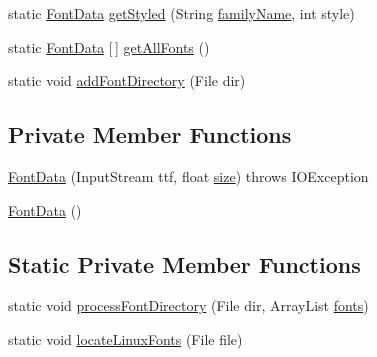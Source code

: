 \begin{DoxyCompactItemize}
\item 
static \mbox{\hyperlink{classorg_1_1newdawn_1_1slick_1_1tools_1_1hiero_1_1truetype_1_1_font_data}{Font\+Data}} \mbox{\hyperlink{classorg_1_1newdawn_1_1slick_1_1tools_1_1hiero_1_1truetype_1_1_font_data_a06cde06f668d43b61523d65ae1d74055}{get\+Styled}} (String \mbox{\hyperlink{classorg_1_1newdawn_1_1slick_1_1tools_1_1hiero_1_1truetype_1_1_font_data_a287c606f09e3581f4eaea1b7bd81ded1}{family\+Name}}, int style)
\item 
static \mbox{\hyperlink{classorg_1_1newdawn_1_1slick_1_1tools_1_1hiero_1_1truetype_1_1_font_data}{Font\+Data}} \mbox{[}$\,$\mbox{]} \mbox{\hyperlink{classorg_1_1newdawn_1_1slick_1_1tools_1_1hiero_1_1truetype_1_1_font_data_a24c78b670366c2eacffbf3b471d9d021}{get\+All\+Fonts}} ()
\item 
static void \mbox{\hyperlink{classorg_1_1newdawn_1_1slick_1_1tools_1_1hiero_1_1truetype_1_1_font_data_a32d549f946e2d1bb1405da459fdaf6ba}{add\+Font\+Directory}} (File dir)
\end{DoxyCompactItemize}
\subsection*{Private Member Functions}
\begin{DoxyCompactItemize}
\item 
\mbox{\hyperlink{classorg_1_1newdawn_1_1slick_1_1tools_1_1hiero_1_1truetype_1_1_font_data_a0cc2d7c13aa1457a3b8853dbbe0936e4}{Font\+Data}} (Input\+Stream ttf, float \mbox{\hyperlink{classorg_1_1newdawn_1_1slick_1_1tools_1_1hiero_1_1truetype_1_1_font_data_a96af538e2a7368fdba46ffc2ad6a9a0e}{size}})  throws I\+O\+Exception 
\item 
\mbox{\hyperlink{classorg_1_1newdawn_1_1slick_1_1tools_1_1hiero_1_1truetype_1_1_font_data_a749bc5408e8c04106d580a31b5c9e597}{Font\+Data}} ()
\end{DoxyCompactItemize}
\subsection*{Static Private Member Functions}
\begin{DoxyCompactItemize}
\item 
static void \mbox{\hyperlink{classorg_1_1newdawn_1_1slick_1_1tools_1_1hiero_1_1truetype_1_1_font_data_a8c35c1c3236ac00f0639ae1947656d28}{process\+Font\+Directory}} (File dir, Array\+List \mbox{\hyperlink{classorg_1_1newdawn_1_1slick_1_1tools_1_1hiero_1_1truetype_1_1_font_data_af5a135e5f654e01a6d82aa58a37d8b24}{fonts}})
\item 
static void \mbox{\hyperlink{classorg_1_1newdawn_1_1slick_1_1tools_1_1hiero_1_1truetype_1_1_font_data_ac8716e3eb111f218e090463b4adb655e}{locate\+Linux\+Fonts}} (File file)
\end{DoxyCompactItemize}
